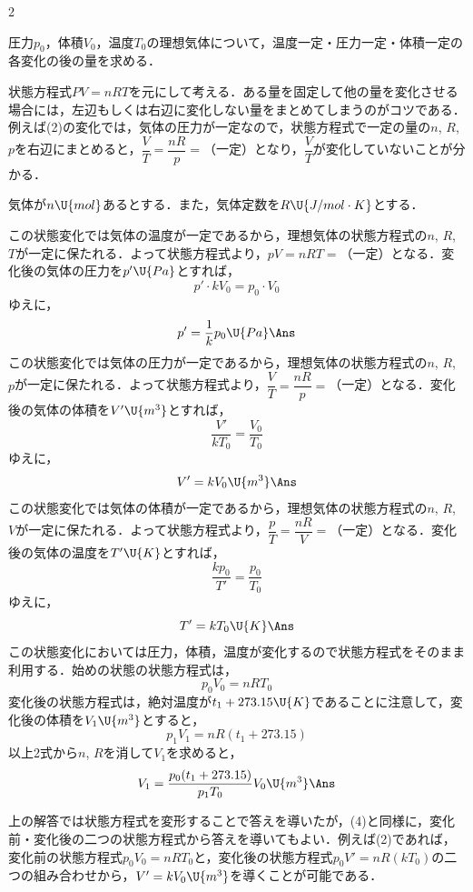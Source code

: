 \begin{multicols}{2}
\begin{kaitou}
\end{kaitou}
\begin{saikei}
圧力$p_0$，体積$V_0$，温度$T_0$の理想気体について，温度一定・圧力一定・体積一定の各変化の後の量を求める．
\end{saikei}
\begin{sisin}
状態方程式$PV=nRT$を元にして考える．ある量を固定して他の量を変化させる場合には，左辺もしくは右辺に変化しない量をまとめてしまうのがコツである．例えば(2)の変化では，気体の圧力が一定なので，状態方程式で一定の量の$n$, $R$, $p$を右辺にまとめると，$\dfrac{V}{T}=\dfrac{nR}{p}=$（一定）となり，$\dfrac{V}{T}$が変化していないことが分かる．
\end{sisin}
\begin{kaitou}
\hspace{1zw}気体が$n\U{mol}$あるとする．また，気体定数を$R\U{J/mol\cdot K}$とする．
\begin{komon}
 この状態変化では気体の温度が一定であるから，理想気体の状態方程式の$n$, $R$, $T$が一定に保たれる．よって状態方程式より，$pV=nRT=$（一定）となる．変化後の気体の圧力を$p'\U{Pa}$とすれば，
       \[p'\cdot kV_0=p_0\cdot V_0\]
       ゆえに，
       \[p'=\frac{1}{k}p_0\U{Pa}\Ans\]
 この状態変化では気体の圧力が一定であるから，理想気体の状態方程式の$n$, $R$, $p$が一定に保たれる．よって状態方程式より，$\dfrac{V}{T}=\dfrac{nR}{p}=$（一定）となる．変化後の気体の体積を$V'\U{m^3}$とすれば，
       \[\frac{V'}{kT_0}=\frac{V_0}{T_0}\]
       ゆえに，
       \[V'=kV_0\U{m^3}\Ans\]
 この状態変化では気体の体積が一定であるから，理想気体の状態方程式の$n$, $R$, $V$が一定に保たれる．よって状態方程式より，$\dfrac{p}{T}=\dfrac{nR}{V}=$（一定）となる．変化後の気体の温度を$T'\U{K}$とすれば，
       \[\frac{kp_0}{T'}=\frac{p_0}{T_0}\]
       ゆえに，
       \[T'=kT_0\U{K}\Ans\]
 この状態変化においては圧力，体積，温度が変化するので状態方程式をそのまま利用する．始めの状態の状態方程式は，
       \[p_0V_0=nRT_0\]
       変化後の状態方程式は，絶対温度が$t_1+273.15\U{K}$であることに注意して，変化後の体積を$V_1\U{m^3}$とすると，
       \[p_1V_1=nR(t_1+273.15)\]
       以上2式から$n$, $R$を消して$V_1$を求めると，
       \[V_1=\frac{p_0(t_1+273.15)}{p_1T_0}V_0\U{m^3}\Ans\]
\end{komon}
\end{kaitou}
\begin{chuu}
\hspace{1zw}上の解答では状態方程式を変形することで答えを導いたが，(4)と同様に，変化前・変化後の二つの状態方程式から答えを導いてもよい．例えば(2)であれば，変化前の状態方程式$p_0V_0=nRT_0$と，変化後の状態方程式$p_0V'=nR(kT_0)$の二つの組み合わせから，$V'=kV_0\U{m^3}$を導くことが可能である．
\end{chuu}


\end{multicols}
